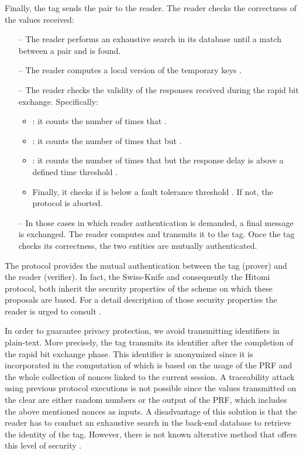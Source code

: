 \documentclass{article}
\begin{document}
\begin{itemize}
    Finally, the tag sends the pair  to the reader.
    The reader checks the correctness of the values received:
    \begin{itemize}
      \item [--] The reader performs an exhaustive search in its database until a match between a pair  and  is found.
      \item [--] The reader computes a local version of the temporary keys . \item [--] The reader checks the validity of the responses received during the rapid bit exchange. Specifically:
      \begin{itemize}
        \item : it counts the number of times that .
        \item : it counts the number of times that  but .
        \item : it counts the number of times that  but the response delay  is above a defined time threshold .
        \item Finally, it checks if  is below a fault tolerance threshold . If not, the protocol is aborted.
      \end{itemize}
    \item[--]In those cases in which reader authentication is demanded, a final message is exchanged. The reader computes  and transmits it to the tag. Once the tag checks its correctness, the two entities are mutually authenticated.
    \end{itemize}
\end{itemize}

The protocol provides the mutual authentication between the tag (prover) and the reader (verifier). In fact, the Swiss-Knife and consequently the Hitomi protocol, both inherit the security properties of the   scheme \cite{188164,1062066} on which these proposals are based.  For a detail description of those security properties the reader is urged  to consult \cite{188164,1062066}.

In order to guarantee privacy protection, we avoid transmitting identifiers in plain-text. More precisely, the tag transmits its identifier after the completion of the rapid bit exchange phase. This identifier is anonymized since it is incorporated in the computation of  which is  based on the usage of the PRF and the whole collection of nonces linked to the current session.  A traceability attack using previous protocol executions is not possible since the values transmitted on the clear are either random numbers or the output of the PRF, which includes the above mentioned nonces as inputs. A disadvantage of this solution is that the reader has to conduct an exhaustive search in the back-end database to retrieve the identity of the tag. However, there is not known alterative method that offers this level of security \cite{KimAKSP-2008-icisc}.
\end{document}
